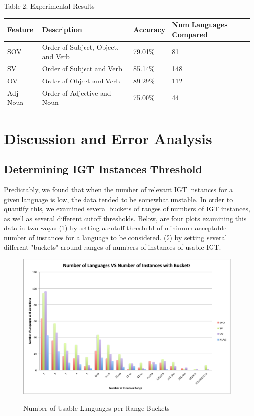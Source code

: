 \documentclass[]{aiaa-tc}
\begin{document}
\begin{center}
Table 2: Experimental Results
\end{center}
\begin{flushleft}
\begin{tabularx}{\textwidth}{|l|X|l|l|}
\hline
  \textbf{Feature} & \textbf{Description} & \textbf{Accuracy} & \textbf{Num Languages Compared} \\
\hline
SOV      & Order of Subject, Object, and Verb & 79.01\% & 81\\
\hline
SV       & Order of Subject and Verb          & 85.14\% & 148\\
\hline
OV       & Order of Object and Verb           & 89.29\% & 112\\
\hline
Adj-Noun & Order of Adjective and Noun        & 75.00\% & 44\\
\hline
\end{tabularx}
\end{flushleft}
\vspace{0.6cm}


\section{Discussion and Error Analysis}

\subsection{Determining IGT Instances Threshold}
Predictably, we found that when the number of relevant IGT instances for a given language is low, the data tended to be somewhat unstable.  In order to quantify this, we examined several buckets of ranges of numbers of IGT instances, as well as several different cutoff thresholds.   Below, are four plots examining this data in two ways: (1) by setting a cutoff threshold of minimum acceptable number of instances for a language to be considered. (2) by setting several different "buckets" around ranges of numbers of instances of usable IGT.

\begin{figure}[H]
\caption{Number of Usable Languages per Range Buckets}
\hspace{-2mm} 
\includegraphics[width=\textwidth]{NumberOfLanguagesVsNumberOfInstancesWithBuckets.pdf}
\label{fig:label}
\end{figure}
\end{document}
